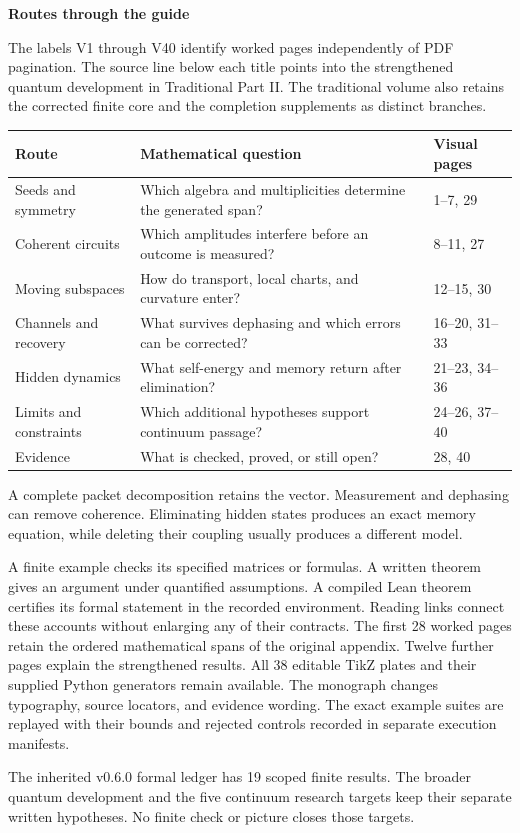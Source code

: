 {\sffamily\bfseries\Large\color{accent}Routes through the guide\par}\vspace{12pt}
The labels V1 through V40 identify worked pages independently of PDF pagination. The source line below each title points into the strengthened quantum development in Traditional Part II. The traditional volume also retains the corrected finite core and the completion supplements as distinct branches.
\begin{center}\small
\begin{tabularx}{\linewidth}{@{}p{1.5in}Yl@{}}\toprule
Route & Mathematical question & Visual pages\\\midrule
Seeds and symmetry & Which algebra and multiplicities determine the generated span? & 1--7, 29\\
Coherent circuits & Which amplitudes interfere before an outcome is measured? & 8--11, 27\\
Moving subspaces & How do transport, local charts, and curvature enter? & 12--15, 30\\
Channels and recovery & What survives dephasing and which errors can be corrected? & 16--20, 31--33\\
Hidden dynamics & What self-energy and memory return after elimination? & 21--23, 34--36\\
Limits and constraints & Which additional hypotheses support continuum passage? & 24--26, 37--40\\
Evidence & What is checked, proved, or still open? & 28, 40\\\bottomrule
\end{tabularx}
\end{center}
A complete packet decomposition retains the vector. Measurement and dephasing can remove coherence. Eliminating hidden states produces an exact memory equation, while deleting their coupling usually produces a different model.

A finite example checks its specified matrices or formulas. A written theorem gives an argument under quantified assumptions. A compiled Lean theorem certifies its formal statement in the recorded environment. Reading links connect these accounts without enlarging any of their contracts.
The first 28 worked pages retain the ordered mathematical spans of the original appendix. Twelve further pages explain the strengthened results. All 38 editable TikZ plates and their supplied Python generators remain available. The monograph changes typography, source locators, and evidence wording. The exact example suites are replayed with their bounds and rejected controls recorded in separate execution manifests.

The inherited v0.6.0 formal ledger has 19 scoped finite results. The broader quantum development and the five continuum research targets keep their separate written hypotheses. No finite check or picture closes those targets.
